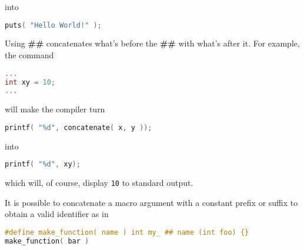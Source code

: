 into 
\lstset{basicstyle=\scriptsize, numbers=left, captionpos=b, tabsize=4}
\begin{lstlisting}[caption=Section \thesection listing \arabic{preprocnt},language={C},
breaklines=true,xleftmargin=15pt, label=lst:section\thesection listing\arabic{preprocnt}]
puts( "Hello World!" );
\end{lstlisting}
		
Using \textbf{\#\#} concatenates what's before the \textbf{\#\#} with what's after it. For example, the command 
\lstset{basicstyle=\scriptsize, numbers=left, captionpos=b, tabsize=4}
\begin{lstlisting}[caption=Section \thesection listing \arabic{preprocnt},language={C},
breaklines=true,xleftmargin=15pt, label=lst:section\thesection listing\arabic{preprocnt}]
...
int xy = 10;
...
\end{lstlisting}
will make the compiler turn 
\lstset{basicstyle=\scriptsize, numbers=left, captionpos=b, tabsize=4}
\begin{lstlisting}[caption=Section \thesection listing \arabic{preprocnt},language={C},
breaklines=true,xleftmargin=15pt, label=lst:section\thesection listing\arabic{preprocnt}]
printf( "%d", concatenate( x, y ));
\end{lstlisting}
		
into 
\lstset{basicstyle=\scriptsize, numbers=left, captionpos=b, tabsize=4}
\begin{lstlisting}[caption=Section \thesection listing \arabic{preprocnt},language={C},
breaklines=true,xleftmargin=15pt, label=lst:section\thesection listing\arabic{preprocnt}]
printf( "%d", xy);
\end{lstlisting}
		
which will, of course, display \texttt{10} to standard output.

It is possible to concatenate a macro argument with a constant prefix or suffix
to obtain a valid identifier as in
\lstset{basicstyle=\scriptsize, numbers=left, captionpos=b, tabsize=4}
\begin{lstlisting}[caption=Section \thesection listing \arabic{preprocnt},language={C},
breaklines=true,xleftmargin=15pt, label=lst:section\thesection listing\arabic{preprocnt}]
#define make_function( name ) int my_ ## name (int foo) {}
make_function( bar )
\end{lstlisting}

